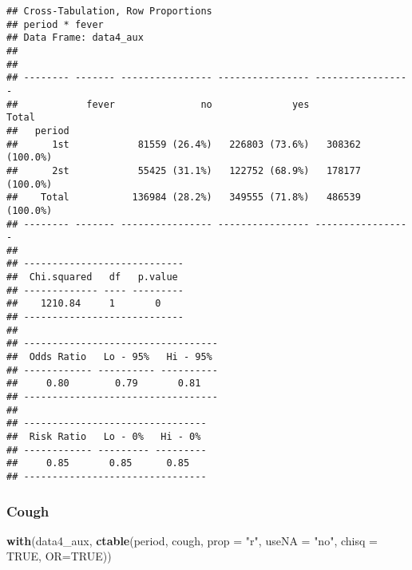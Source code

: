 \documentclass[
]{article}
\newenvironment{Shaded}{\begin{snugshade}}{\end{snugshade}}
\newcommand{\DataTypeTok}[1]{\textcolor[rgb]{0.13,0.29,0.53}{#1}}
\newcommand{\KeywordTok}[1]{\textcolor[rgb]{0.13,0.29,0.53}{\textbf{#1}}}
\newcommand{\NormalTok}[1]{#1}
\newcommand{\OtherTok}[1]{\textcolor[rgb]{0.56,0.35,0.01}{#1}}
\newcommand{\StringTok}[1]{\textcolor[rgb]{0.31,0.60,0.02}{#1}}
\begin{document}
\begin{verbatim}
## Cross-Tabulation, Row Proportions  
## period * fever  
## Data Frame: data4_aux  
## 
## 
## -------- ------- ---------------- ---------------- -----------------
##            fever               no              yes             Total
##   period                                                            
##      1st            81559 (26.4%)   226803 (73.6%)   308362 (100.0%)
##      2st            55425 (31.1%)   122752 (68.9%)   178177 (100.0%)
##    Total           136984 (28.2%)   349555 (71.8%)   486539 (100.0%)
## -------- ------- ---------------- ---------------- -----------------
## 
## ----------------------------
##  Chi.squared   df   p.value 
## ------------- ---- ---------
##    1210.84     1       0    
## ----------------------------
## 
## ----------------------------------
##  Odds Ratio   Lo - 95%   Hi - 95% 
## ------------ ---------- ----------
##     0.80        0.79       0.81   
## ----------------------------------
## 
## --------------------------------
##  Risk Ratio   Lo - 0%   Hi - 0% 
## ------------ --------- ---------
##     0.85       0.85      0.85   
## --------------------------------
\end{verbatim}

\hypertarget{cough-1}{%
\subsubsection{Cough}\label{cough-1}}

\begin{Shaded}
\begin{Highlighting}[]
\KeywordTok{with}\NormalTok{(data4_aux, }\KeywordTok{ctable}\NormalTok{(period, cough, }\DataTypeTok{prop =} \StringTok{"r"}\NormalTok{, }\DataTypeTok{useNA =} \StringTok{"no"}\NormalTok{, }\DataTypeTok{chisq =} \OtherTok{TRUE}\NormalTok{, }\DataTypeTok{OR=}\OtherTok{TRUE}\NormalTok{))}
\end{Highlighting}
\end{Shaded}
\end{document}
